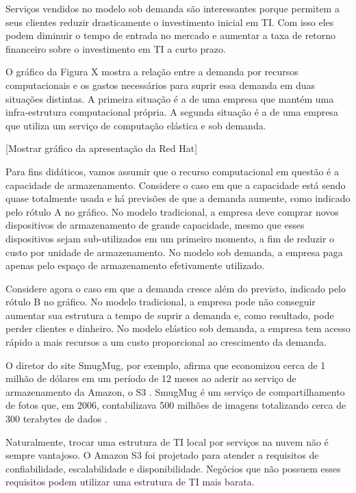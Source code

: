 Serviços vendidos no modelo sob demanda são interessantes porque permitem a seus clientes reduzir drasticamente o investimento inicial em TI. Com isso eles podem diminuir o tempo de entrada no mercado e aumentar a taxa de retorno financeiro sobre o investimento em TI a curto prazo.

O gráfico da Figura X mostra a relação entre a demanda por recursos computacionais e os gastos necessários para suprir essa demanda em duas situações distintas. A primeira situação é a de uma empresa que mantém uma infra-estrutura computacional própria. A segunda situação é a de uma empresa que utiliza um serviço de computação elástica e sob demanda.

[Mostrar gráfico da apresentação da Red Hat]

Para fins didáticos, vamos assumir que o recurso computacional em questão é a capacidade de armazenamento. Considere o caso em que a capacidade está sendo quase totalmente usada e há previsões de que a demanda aumente, como indicado pelo rótulo A no gráfico. No modelo tradicional, a empresa deve comprar novos dispositivos de armazenamento de grande capacidade,
mesmo que esses dispositivos sejam sub-utilizados em um primeiro momento,
a fim de reduzir o custo por unidade de armazenamento. No modelo sob demanda, a empresa paga apenas pelo espaço de armazenamento efetivamente utilizado.

Considere agora o caso em que a demanda cresce além do previsto, indicado pelo rótulo B no gráfico. No modelo tradicional, a empresa pode não conseguir aumentar sua estrutura a tempo de suprir a demanda e, como resultado, pode perder clientes e dinheiro. No modelo elástico sob demanda, a empresa tem acesso rápido a mais recursos a um custo proporcional ao crescimento da demanda.

O diretor do site SmugMug, por exemplo, afirma que economizou cerca de 1 milhão de dólares em um período de 12 meses ao aderir ao serviço de armazenamento da Amazon, o S3 \cite{http://blogs.smugmug.com/don/2006/11/10/amazon-s3-show-me-the-money/}. SmugMug é um serviço de compartilhamento de fotos que, em 2006, contabilizava 500 milhões de imagens totalizando cerca de 300 terabytes de dados \cite{http://blogs.smugmug.com/don/2006/08/12/amazon-s3-the-holy-grail/}.

Naturalmente, trocar uma estrutura de TI local por serviços na nuvem não é sempre vantajoso. O Amazon S3 foi projetado para atender a requisitos de confiabilidade, escalabilidade e disponibilidade. Negócios que não possuem esses requisitos podem utilizar uma estrutura de TI mais barata.

